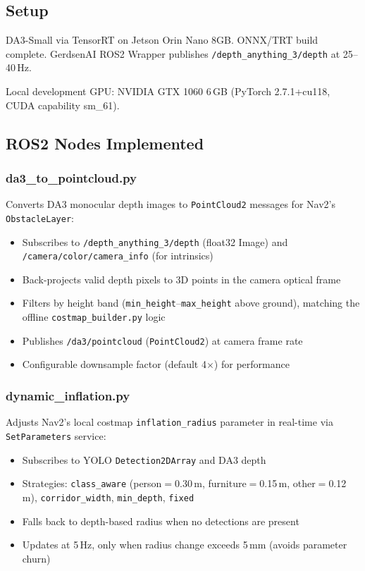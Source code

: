 \documentclass[11pt,a4paper]{article}
\begin{document}
\subsection{Setup}

DA3-Small via TensorRT on Jetson Orin Nano 8GB. ONNX/TRT build complete.
GerdsenAI ROS2 Wrapper publishes \texttt{/depth\_anything\_3/depth} at
25--40\,Hz.

Local development GPU: NVIDIA GTX 1060 6\,GB (PyTorch 2.7.1+cu118,
CUDA capability sm\_61).

\subsection{ROS2 Nodes Implemented}

\subsubsection{da3\_to\_pointcloud.py}

Converts DA3 monocular depth images to \texttt{PointCloud2} messages
for Nav2's \texttt{ObstacleLayer}:

\begin{itemize}[nosep]
  \item Subscribes to \texttt{/depth\_anything\_3/depth} (float32 Image)
    and \texttt{/camera/color/camera\_info} (for intrinsics)
  \item Back-projects valid depth pixels to 3D points in the camera
    optical frame
  \item Filters by height band (\texttt{min\_height}--\texttt{max\_height}
    above ground), matching the offline \texttt{costmap\_builder.py} logic
  \item Publishes \texttt{/da3/pointcloud} (\texttt{PointCloud2}) at
    camera frame rate
  \item Configurable downsample factor (default 4$\times$) for
    performance
\end{itemize}

\subsubsection{dynamic\_inflation.py}

Adjusts Nav2's local costmap \texttt{inflation\_radius} parameter
in real-time via \texttt{SetParameters} service:

\begin{itemize}[nosep]
  \item Subscribes to YOLO \texttt{Detection2DArray} and DA3 depth
  \item Strategies: \texttt{class\_aware} (person$=$0.30\,m,
    furniture$=$0.15\,m, other$=$0.12\,m), \texttt{corridor\_width},
    \texttt{min\_depth}, \texttt{fixed}
  \item Falls back to depth-based radius when no detections are present
  \item Updates at 5\,Hz, only when radius change exceeds 5\,mm
    (avoids parameter churn)
\end{itemize}
\end{document}
